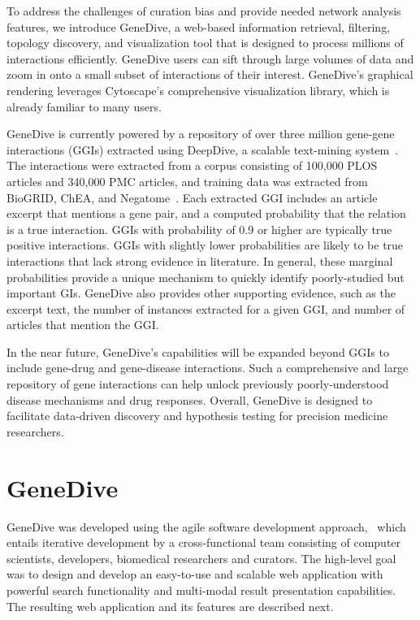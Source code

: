 \documentclass{ws-procs11x85}
\begin{document}
To address the challenges of curation bias and provide needed network analysis features, we introduce GeneDive, a web-based information retrieval, filtering, topology discovery, and visualization tool that is designed to process millions of interactions efficiently. GeneDive users can sift through large volumes of data and zoom in onto a small subset of interactions of their interest. GeneDive's graphical rendering leverages Cytoscape's comprehensive visualization library, which is already familiar to many users. 

GeneDive is currently powered by a repository of over three million gene-gene interactions (GGIs) extracted using DeepDive, a scalable text-mining system~\cite{deepdive}.  The interactions were extracted from a corpus consisting of 100,000 PLOS articles and 340,000 PMC articles, and training data was extracted from BioGRID, ChEA, and Negatome~\cite{em2016}. Each extracted GGI includes an article excerpt that mentions a gene pair, and a computed probability that the relation is a true interaction. GGIs with probability of 0.9 or higher are typically true positive interactions. GGIs with slightly lower probabilities are likely to be true interactions that lack strong evidence in literature. In general, these marginal probabilities provide a unique mechanism to quickly identify poorly-studied but important GIs. GeneDive also provides other supporting evidence, such as the excerpt text, the number of instances extracted for a given GGI, and number of articles that mention the GGI.

In the near future, GeneDive's capabilities will be expanded beyond GGIs to include gene-drug and gene-disease interactions. Such a comprehensive and large repository of gene interactions can help unlock previously poorly-understood disease mechanisms and drug responses. Overall, GeneDive is designed to facilitate data-driven discovery and hypothesis testing for precision medicine researchers.




\section{GeneDive}
\label{sec:genedive}
GeneDive was developed using the agile software development approach,~\cite{agile} which entails iterative development by a cross-functional team consisting of computer scientists, developers, biomedical researchers and curators. The high-level goal was to design and develop an easy-to-use and scalable web application with powerful search functionality and multi-modal result presentation capabilities. The resulting web application and its features are described next.
\end{document}
